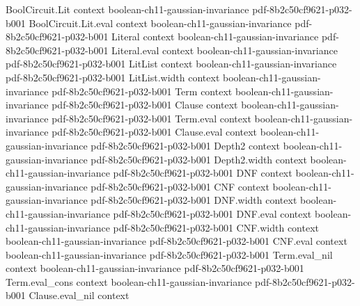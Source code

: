 \begin{theorem}
\label{BooleanAnalysis.GaussianSpace.gaussianGenerator_eq_differential}
\leanok
{}
\proofstep
  {BoolCircuit.Lit}
  {context}
  {boolean-ch11-gaussian-invariance}
  {pdf-8b2c50cf9621-p032-b001}
\proofstep
  {BoolCircuit.Lit.eval}
  {context}
  {boolean-ch11-gaussian-invariance}
  {pdf-8b2c50cf9621-p032-b001}
\proofstep
  {Literal}
  {context}
  {boolean-ch11-gaussian-invariance}
  {pdf-8b2c50cf9621-p032-b001}
\proofstep
  {Literal.eval}
  {context}
  {boolean-ch11-gaussian-invariance}
  {pdf-8b2c50cf9621-p032-b001}
\proofstep
  {LitList}
  {context}
  {boolean-ch11-gaussian-invariance}
  {pdf-8b2c50cf9621-p032-b001}
\proofstep
  {LitList.width}
  {context}
  {boolean-ch11-gaussian-invariance}
  {pdf-8b2c50cf9621-p032-b001}
\proofstep
  {Term}
  {context}
  {boolean-ch11-gaussian-invariance}
  {pdf-8b2c50cf9621-p032-b001}
\proofstep
  {Clause}
  {context}
  {boolean-ch11-gaussian-invariance}
  {pdf-8b2c50cf9621-p032-b001}
\proofstep
  {Term.eval}
  {context}
  {boolean-ch11-gaussian-invariance}
  {pdf-8b2c50cf9621-p032-b001}
\proofstep
  {Clause.eval}
  {context}
  {boolean-ch11-gaussian-invariance}
  {pdf-8b2c50cf9621-p032-b001}
\proofstep
  {Depth2}
  {context}
  {boolean-ch11-gaussian-invariance}
  {pdf-8b2c50cf9621-p032-b001}
\proofstep
  {Depth2.width}
  {context}
  {boolean-ch11-gaussian-invariance}
  {pdf-8b2c50cf9621-p032-b001}
\proofstep
  {DNF}
  {context}
  {boolean-ch11-gaussian-invariance}
  {pdf-8b2c50cf9621-p032-b001}
\proofstep
  {CNF}
  {context}
  {boolean-ch11-gaussian-invariance}
  {pdf-8b2c50cf9621-p032-b001}
\proofstep
  {DNF.width}
  {context}
  {boolean-ch11-gaussian-invariance}
  {pdf-8b2c50cf9621-p032-b001}
\proofstep
  {DNF.eval}
  {context}
  {boolean-ch11-gaussian-invariance}
  {pdf-8b2c50cf9621-p032-b001}
\proofstep
  {CNF.width}
  {context}
  {boolean-ch11-gaussian-invariance}
  {pdf-8b2c50cf9621-p032-b001}
\proofstep
  {CNF.eval}
  {context}
  {boolean-ch11-gaussian-invariance}
  {pdf-8b2c50cf9621-p032-b001}
\proofstep
  {Term.eval_nil}
  {context}
  {boolean-ch11-gaussian-invariance}
  {pdf-8b2c50cf9621-p032-b001}
\proofstep
  {Term.eval_cons}
  {context}
  {boolean-ch11-gaussian-invariance}
  {pdf-8b2c50cf9621-p032-b001}
\proofstep
  {Clause.eval_nil}
  {context}

\end{theorem}
